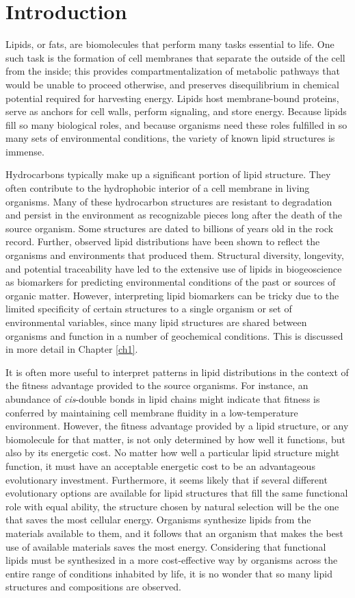 \chapter[INTRODUCTION]{Introduction}


Lipids, or fats, are biomolecules that perform many tasks essential to life. One such task is the formation of cell membranes that separate the outside of the cell from the inside; this provides compartmentalization of metabolic pathways that would be unable to proceed otherwise, and preserves disequilibrium in chemical potential required for harvesting energy. Lipids host membrane-bound proteins, serve as anchors for cell walls, perform signaling, and store energy. Because lipids fill so many biological roles, and because organisms need these roles fulfilled in so many sets of environmental conditions, the variety of known lipid structures is immense.

Hydrocarbons typically make up a significant portion of lipid structure. They often contribute to the hydrophobic interior of a cell membrane in living organisms. Many of these hydrocarbon structures are resistant to degradation and persist in the environment as recognizable pieces long after the death of the source organism. Some structures are dated to billions of years old in the rock record. Further, observed lipid distributions have been shown to reflect the organisms and environments that produced them. Structural diversity, longevity, and potential traceability have led to the extensive use of lipids in biogeoscience as biomarkers for predicting environmental conditions of the past or sources of organic matter. However, interpreting lipid biomarkers can be tricky due to the limited specificity of certain structures to a single organism or set of environmental variables, since many lipid structures are shared between organisms and function in a number of geochemical conditions. This is discussed in more detail in Chapter \ref{ch1}.

It is often more useful to interpret patterns in lipid distributions in the context of the fitness advantage provided to the source organisms. For instance, an abundance of \textit{cis}-double bonds in lipid chains might indicate that fitness is conferred by maintaining cell membrane fluidity in a low-temperature environment. However, the fitness advantage provided by a lipid structure, or any biomolecule for that matter, is not only determined by how well it functions, but also by its energetic cost. No matter how well a particular lipid structure might function, it must have an acceptable energetic cost to be an advantageous evolutionary investment. Furthermore, it seems likely that if several different evolutionary options are available for lipid structures that fill the same functional role with equal ability, the structure chosen by natural selection will be the one that saves the most cellular energy. Organisms synthesize lipids from the materials available to them, and it follows that an organism that makes the best use of available materials saves the most energy. Considering that functional lipids must be synthesized in a more cost-effective way by organisms across the entire range of conditions inhabited by life, it is no wonder that so many lipid structures and compositions are observed. 

